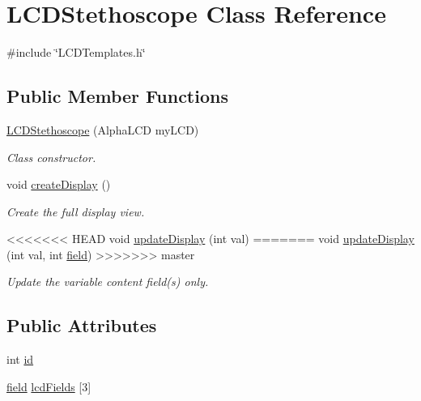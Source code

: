 \hypertarget{class_l_c_d_stethoscope}{\section{L\-C\-D\-Stethoscope Class Reference}
\label{class_l_c_d_stethoscope}
}


{\ttfamily \#include \char`\"{}L\-C\-D\-Templates.\-h\char`\"{}}

\subsection*{Public Member Functions}
\begin{DoxyCompactItemize}
\item 
\hyperlink{class_l_c_d_stethoscope_af9f8f2067a0b31bffa6fbc6a3db86287}{L\-C\-D\-Stethoscope} (Alpha\-L\-C\-D my\-L\-C\-D)
\begin{DoxyCompactList}\small\item\em Class constructor. \end{DoxyCompactList}\item 
void \hyperlink{class_l_c_d_stethoscope_a2641dd844d4070d6f498ba20c04cdfac}{create\-Display} ()
\begin{DoxyCompactList}\small\item\em Create the full display view. \end{DoxyCompactList}\item 
<<<<<<< HEAD
void \hyperlink{class_l_c_d_stethoscope_a6b1c171fbe2cc21944e26af50135ba31}{update\-Display} (int val)
=======
void \hyperlink{class_l_c_d_stethoscope_a4e5adf113971de39ff817b977ceb12b0}{update\-Display} (int val, int \hyperlink{_l_c_d_templates_8h_a20a49e010fbfc3a43959f12d92e01bb6}{field})
>>>>>>> master
\begin{DoxyCompactList}\small\item\em Update the variable content field(s) only. \end{DoxyCompactList}\end{DoxyCompactItemize}
\subsection*{Public Attributes}
\begin{DoxyCompactItemize}
\item 
int \hyperlink{class_l_c_d_stethoscope_a865d5b5da67eb0841c34b1a436ef28ba}{id}
\item 
\hyperlink{_l_c_d_templates_8h_a20a49e010fbfc3a43959f12d92e01bb6}{field} \hyperlink{class_l_c_d_stethoscope_ad36003e685beee5f2268fd4ef1f0db8c}{lcd\-Fields} \mbox{[}3\mbox{]}
\end{DoxyCompactItemize}
